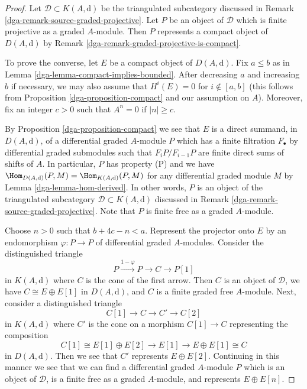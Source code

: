 \begin{proof}

Let $\mathcal{D} \subset K(A, \text{d})$ be the triangulated subcategory
discussed in Remark \ref{dga-remark-source-graded-projective}.
Let $P$ be an object of $\mathcal{D}$ which is finite projective
as a graded $A$-module. Then $P$ represents a compact object of
$D(A, \text{d})$ by Remark \ref{dga-remark-graded-projective-is-compact}.

\medskip\noindent
To prove the converse, let $E$ be a compact object of $D(A, \text{d})$.
Fix $a \leq b$ as in Lemma \ref{dga-lemma-compact-implies-bounded}.
After decreasing $a$ and increasing $b$ if necessary, we may also
assume that $H^i(E) = 0$ for $i \not \in [a, b]$ (this follows
from Proposition \ref{dga-proposition-compact} and our assumption on $A$).
Moreover, fix an integer $c > 0$ such that $A^n = 0$ if $|n| \geq c$.

\medskip\noindent
By Proposition \ref{dga-proposition-compact} we see that $E$ is a direct
summand, in $D(A, \text{d})$, of a differential graded $A$-module $P$
which has a finite filtration $F_\bullet$ by differential
graded submodules such that $F_iP/F_{i - 1}P$ are finite direct sums
of shifts of $A$. In particular, $P$ has property (P) and we have
$\Hom_{D(A, \text{d})}(P, M) = \Hom_{K(A, \text{d})}(P, M)$ for any
differential graded module $M$ by Lemma \ref{dga-lemma-hom-derived}.
In other words, $P$ is an object of the triangulated
subcategory $\mathcal{D} \subset K(A, \text{d})$ discussed in
Remark \ref{dga-remark-source-graded-projective}.
Note that $P$ is finite free as a graded $A$-module.

\medskip\noindent
Choose $n > 0$ such that $b + 4c - n < a$.
Represent the projector onto $E$ by an endomorphism $\varphi : P \to P$ of
differential graded $A$-modules. Consider the distinguished triangle
$$
P \xrightarrow{1 - \varphi} P \to C \to P[1]
$$
in $K(A, \text{d})$ where $C$ is the cone of the first arrow. Then
$C$ is an object of $\mathcal{D}$,
we have $C \cong E \oplus E[1]$ in $D(A, \text{d})$, and
$C$ is a finite graded free $A$-module.
Next, consider a distinguished triangle
$$
C[1] \to C \to C' \to C[2]
$$
in $K(A, \text{d})$ where $C'$ is the cone on a morphism $C[1] \to C$
representing the composition
$$
C[1] \cong E[1] \oplus E[2] \to E[1] \to E \oplus E[1] \cong C
$$
in $D(A, \text{d})$. Then we see that $C'$ represents $E \oplus E[2]$.
Continuing in this manner we see that we can find a differential
graded $A$-module $P$ which is an object of $\mathcal{D}$,
is a finite free as a graded $A$-module, and represents $E \oplus E[n]$.


\end{proof}
